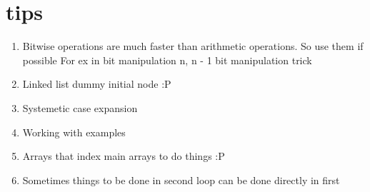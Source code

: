 \documentclass[../main.tex]{subfiles}
\begin{document}
\chapter{tips}

\begin{enumerate}
  \item Bitwise operations are much faster than arithmetic operations. So use them if possible
    For ex in bit manipulation n, n - 1 bit manipulation trick
  \item Linked list dummy initial node :P
  \item Systemetic case expansion
  \item Working with examples
  \item Arrays that index main arrays to do things :P
  \item Sometimes things to be done in second loop can be done directly in first
\end{enumerate}
\end{document}
